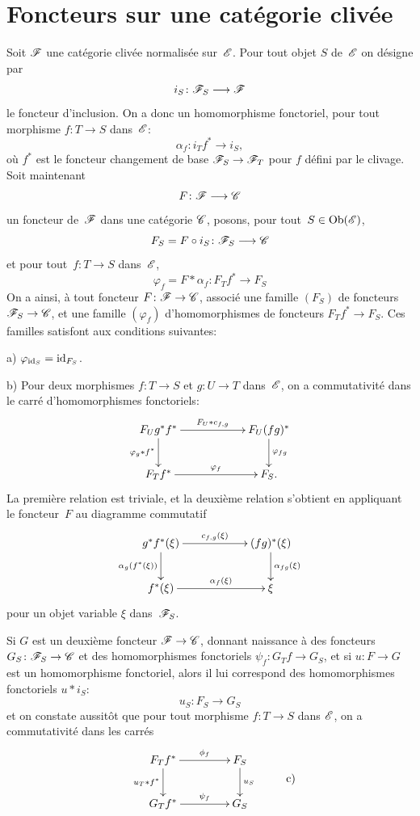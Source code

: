 \section{Foncteurs sur une cat\'egorie cliv\'ee}
\label{VI.12}

Soit $\cal{F}$ une cat\'egorie cliv\'ee normalis\'ee
sur~$\cal{E}$. Pour tout objet $S$ de~$\cal{E}$ on d\'esigne par
$$
i_S\colon \cal{F}_S\to\cal{F}
$$
le foncteur d'inclusion. On a donc un homomorphisme fonctoriel, pour
tout morphisme $f\colon T\to S$ dans~$\cal{E}$:
$$
\alpha_f\colon i_T f^*\to i_S,
$$
o\`u $f^*$ est le foncteur changement de base
$\cal{F}_S\to\cal{F}_T$ pour $f$ d\'efini par le clivage. Soit
maintenant
$$
F\colon\cal{F}\to\cal{C}
$$
un foncteur de~$\cal{F}$ dans une cat\'egorie $\cal{C}$, posons,
pour tout~$S\in\Ob(\cal{E})$,
$$
F_S=F\circ i_S\colon\cal{F}_S\to\cal{C}
$$
et pour tout~$f\colon T\to S$ dans~$\cal{E}$,
$$
\varphi_f=F*\alpha_f\colon F_T f^*\to F_S
$$
On a ainsi, \`a tout foncteur $F\colon \cal{F}\to\cal{C}$,
associ\'e une famille $(F_S)$ de foncteurs $\cal{F}_S\to\cal{C}$, et
une famille $(\varphi_f)$ d'homomorphismes de foncteurs $F_T f^*\to
F_S$. Ces familles satisfont aux conditions suivantes:

a) $\varphi_{\mathrm{id}_S}=\mathrm{id}_{F_S}$.

b) Pour deux morphismes $f\colon T\to S$ et $g\colon U\to T$
dans~$\cal{E}$, on a commutativit\'e dans le carr\'e
d'homomorphismes fonctoriels:
$$
\xymatrix@C=2cm{{F_U g^* f^*}\ar[r]^-{F_U*c_{f,g}}\ar[d]_{\varphi_g * f^*}&{F_U(fg)^*}\ar[d]^{\varphi_{fg}}\\{F_T f^*}\ar[r]^-{\varphi_f}&{F_S.}}
$$
La premi\`ere relation est triviale, et la deuxi\`eme relation
s'obtient en appliquant le foncteur~$F$ au diagramme commutatif
$$
\xymatrix@C=2cm{{g^* f^* (\xi)}\ar[r]^-{c_{f,g}(\xi)}\ar[d]_{\alpha_g(f^*(\xi))}&{(fg)^*(\xi)}\ar[d]^{\alpha_{fg}(\xi)}\\{f^*(\xi)}\ar[r]^-{\alpha_f(\xi)}&{\xi}}
$$
pour un objet variable $\xi$ dans~$\cal{F}_S$.

Si $G$ est un deuxi\`eme foncteur $\cal{F}\to\cal{C}$, donnant
naissance \`a des foncteurs $G_S\colon\cal{F}_S\to\cal{C}$ et des
homomorphismes fonctoriels $\psi_f\colon G_Tf\to G_S$, et si $u\colon
F\to G$ est un homomorphisme fonctoriel, alors il lui correspond des
homomorphismes fonctoriels $u*i_S$:
$$
u_S\colon F_S\to G_S
$$
et on constate aussit\^ot que pour tout morphisme $f\colon T\to S$
dans $\cal{E}$, on a commutativit\'e dans les carr\'es
\begin{equation*}
\begin{array}{c}
\xymatrix@C=1.5cm{{F_Tf^*}\ar[r]^-{\phi_f}\ar[d]_{u_T * f^*}&{F_S}\ar[d]^{u_S}\\{G_T f^*}\ar[r]^-{\psi_f}&{G_S}}
\end{array}
\tag*{c)}
\end{equation*}

